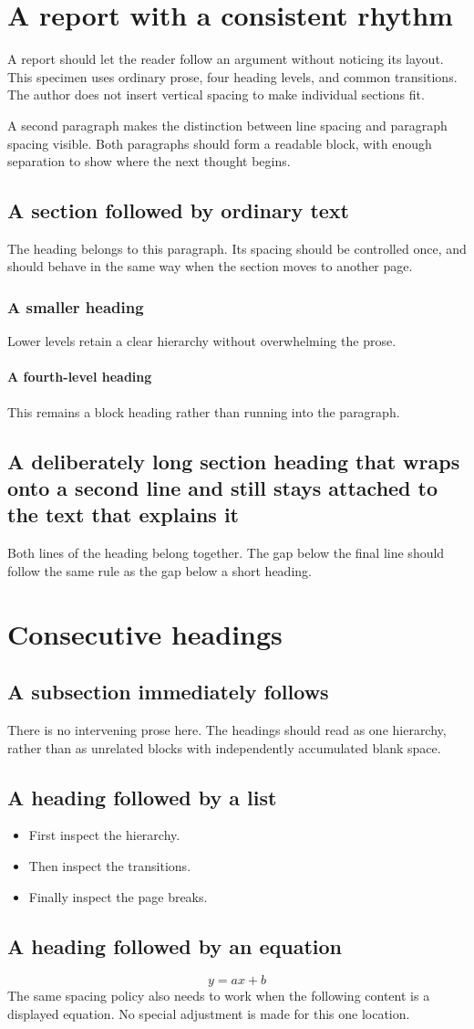 \documentclass[11pt,parskip=half]{scrartcl}
\begin{document}
\section{A report with a consistent rhythm}
A report should let the reader follow an argument without noticing its layout.
This specimen uses ordinary prose, four heading levels, and common transitions.
The author does not insert vertical spacing to make individual sections fit.

A second paragraph makes the distinction between line spacing and paragraph
spacing visible. Both paragraphs should form a readable block, with enough
separation to show where the next thought begins.

\subsection{A section followed by ordinary text}
The heading belongs to this paragraph. Its spacing should be controlled once,
and should behave in the same way when the section moves to another page.
\subsubsection{A smaller heading}
Lower levels retain a clear hierarchy without overwhelming the prose.
\paragraph{A fourth-level heading}
This remains a block heading rather than running into the paragraph.
\subsection{A deliberately long section heading that wraps onto a second line and still stays attached to the text that explains it}
Both lines of the heading belong together. The gap below the final line should
follow the same rule as the gap below a short heading.
\section{Consecutive headings}
\subsection{A subsection immediately follows}
There is no intervening prose here. The headings should read as one hierarchy,
rather than as unrelated blocks with independently accumulated blank space.
\subsection{A heading followed by a list}
\begin{itemize}
\item First inspect the hierarchy.
\item Then inspect the transitions.
\item Finally inspect the page breaks.
\end{itemize}
\subsection{A heading followed by an equation}
\[y=ax+b\]
The same spacing policy also needs to work when the following content is a
displayed equation. No special adjustment is made for this one location.
\end{document}
